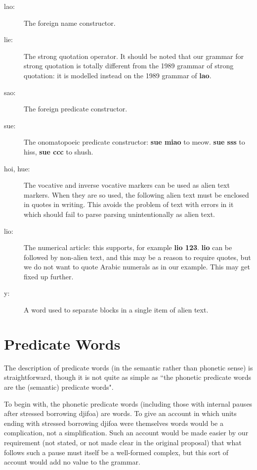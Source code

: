 \documentclass[12pt]{book}
\begin{document}
\begin{description}

\item[lao:]  The foreign name constructor.

\item[lie:]  The strong quotation operator.  It should be noted that our grammar for strong quotation is totally different from the 1989 grammar of strong quotation:  it is modelled instead on the 1989 grammar of {\bf lao}.

\item[sao:]  The foreign predicate constructor.

\item[sue:]  The onomatopoeic predicate constructor:  {\bf sue miao} to meow. {\bf sue sss} to hiss, {\bf sue ccc} to shush.

\item[hoi, hue:]  The vocative and inverse vocative markers can be used as alien text markers.  When they are so used, the following alien text must be enclosed in quotes in writing.  This avoids the problem of text with errors in it which should fail to parse parsing unintentionally as alien text.

\item[lio:]  The numerical article:  this supports, for example {\bf lio 123}.  {\bf lio} can be followed by non-alien text, and this may be a reason to require quotes, but we do not want to quote Arabic numerals as in our example.  This may get fixed up further.

\item[y:]  A word used to separate blocks in a single item of alien text.

\end{description}

\section{Predicate Words}

The description of predicate words (in the semantic rather than phonetic sense) is straightforward, though it is not quite as simple as ``the phonetic predicate words are the (semantic) predicate words".

To begin with, the phonetic predicate words (including those with internal pauses after stressed borrowing djifoa) are words.  To give an account in which units ending with
stressed borrowing djifoa were themselves words would be a complication, not a simplification.  Such an account would be made easier by our requirement (not stated, or not made clear in the original proposal) that what follows such a pause must itself be a well-formed complex, but this sort of account would add no value to the grammar.
\end{document}
